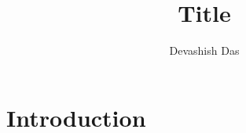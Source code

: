\documentclass[11pt]{article}
\title{\Large \bfseries Title}
\author{\normalsize Devashish Das}
\date{}
\begin{document}
\maketitle

\section{Introduction}

% 
% 
\end{document}
